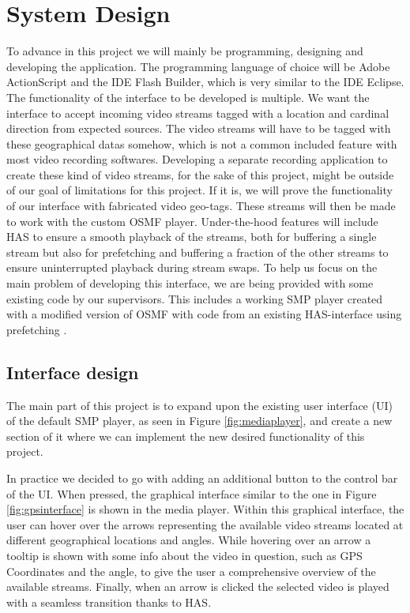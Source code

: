 \chapter{System Design}
\label{cha:sysdesign}

To advance in this project we will mainly be programming, designing and developing the application. The programming language of choice will be Adobe ActionScript and the IDE Flash Builder, which is very similar to the IDE Eclipse. The functionality of the interface to be developed is multiple. We want the interface to accept incoming video streams tagged with a location and cardinal direction from expected sources. The video streams will have to be tagged with these geographical datas somehow, which is not a common included feature with most video recording softwares. Developing a separate recording application to create these kind of video streams, for the sake of this project, might be outside of our goal of limitations for this project. If it is, we will prove the functionality of our interface with fabricated video geo-tags. These streams will then be made to work with the custom OSMF player.  Under-the-hood features will include HAS to ensure a smooth playback of the streams, both for buffering a single stream but also for prefetching and buffering a fraction of the other streams to ensure uninterrupted playback during stream swaps. To help us focus on the main problem of developing this interface, we are being provided with some existing code by our supervisors. This includes a working SMP player created with a modified version of OSMF with code from an existing HAS-interface using prefetching \cite{qualbranch}.

\section{Interface design}
\label{sec:interfacedesign}

The main part of this project is to expand upon the existing user interface (UI) of the default SMP player, as seen in Figure \ref{fig:mediaplayer}, and create a new section of it where we can implement the new desired functionality of this project. 

In practice we decided to go with adding an additional button to the control bar of the UI. When pressed, the graphical interface similar to the one in Figure \ref{fig:gpsinterface} is shown in the media player. Within this graphical interface, the user can hover over the arrows representing the available video streams located at different geographical locations and angles. While hovering over an arrow a tooltip is shown with some info about the video in question, such as GPS Coordinates and the angle, to give the user a comprehensive overview of the available streams. Finally, when an arrow is clicked the selected video is played with a seamless transition thanks to HAS.

